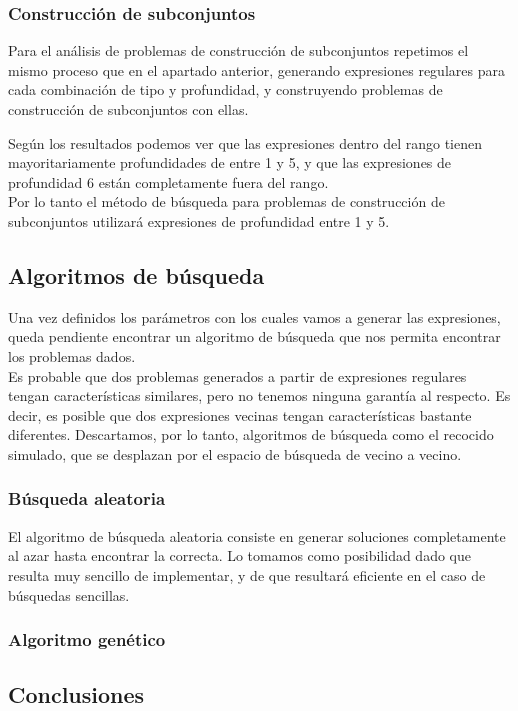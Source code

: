 \subsubsection{Construcción de subconjuntos}

Para el análisis de problemas de construcción de subconjuntos repetimos el mismo proceso que en el apartado anterior, generando expresiones regulares para cada combinación de tipo y profundidad, y construyendo problemas de construcción de subconjuntos con ellas.


Según los resultados podemos ver que las expresiones dentro del rango tienen mayoritariamente profundidades de entre 1 y 5, y que las expresiones de profundidad 6 están completamente fuera del rango.
\\
Por lo tanto el método de búsqueda para problemas de construcción de subconjuntos utilizará expresiones de profundidad entre 1 y 5.

\subsection{Algoritmos de búsqueda}

Una vez definidos los parámetros con los cuales vamos a generar las expresiones, queda pendiente encontrar un algoritmo de búsqueda que nos permita encontrar los problemas dados.
\\
Es probable que dos problemas generados a partir de expresiones regulares tengan características similares, pero no tenemos ninguna garantía al respecto.
Es decir, es posible que dos expresiones vecinas tengan características bastante diferentes.
Descartamos, por lo tanto, algoritmos de búsqueda como el recocido simulado, que se desplazan por el espacio de búsqueda de vecino a vecino.

\subsubsection{Búsqueda aleatoria}

El algoritmo de búsqueda aleatoria consiste en generar soluciones completamente al azar hasta encontrar la correcta. Lo tomamos como posibilidad dado que resulta muy sencillo de implementar, y de que resultará eficiente en el caso de búsquedas sencillas.


\subsubsection{Algoritmo genético}


\subsection{Conclusiones}
